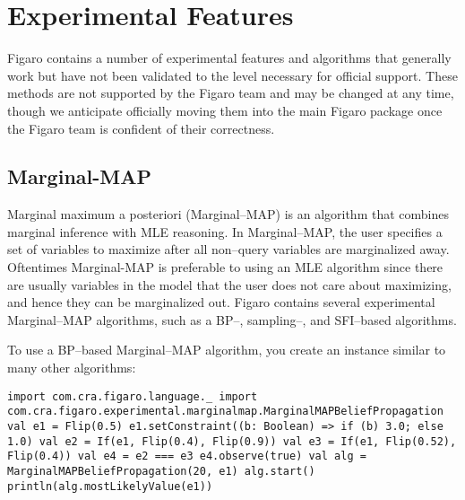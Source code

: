 
\chapter{Experimental Features} %

\label{Experimental} %

Figaro contains a number of experimental features and algorithms that generally work but have not been validated to the level necessary for official support. These methods are not supported by the Figaro team and may be changed at any time, though we anticipate officially moving them into the main Figaro package once the Figaro team is confident of their correctness.

\section{Marginal-MAP}
Marginal maximum a posteriori (Marginal--MAP) is an algorithm that combines marginal inference with MLE reasoning. In Marginal--MAP, the user specifies a set of variables to maximize after all non--query variables are marginalized away. Oftentimes Marginal-MAP is preferable to using an MLE algorithm since there are usually variables in the model that the user does not care about maximizing, and hence they can be marginalized out. Figaro contains several experimental Marginal--MAP algorithms, such as a BP--, sampling--, and SFI--based algorithms.

To use a BP--based Marginal--MAP algorithm, you create an instance similar to many other algorithms:

\begin{flushleft}
\texttt{import com.cra.figaro.language.\_
\newline import
\newline com.cra.figaro.experimental.marginalmap.MarginalMAPBeliefPropagation
\newline
\newline val e1 = Flip(0.5)
\newline e1.setConstraint((b: Boolean) => if (b) 3.0; else 1.0)
\newline val e2 = If(e1, Flip(0.4), Flip(0.9))
\newline val e3 = If(e1, Flip(0.52), Flip(0.4))
\newline val e4 = e2 === e3
\newline e4.observe(true)
\newline
\newline val alg = MarginalMAPBeliefPropagation(20, e1)
\newline alg.start()
\newline println(alg.mostLikelyValue(e1))
}
\end{flushleft}

